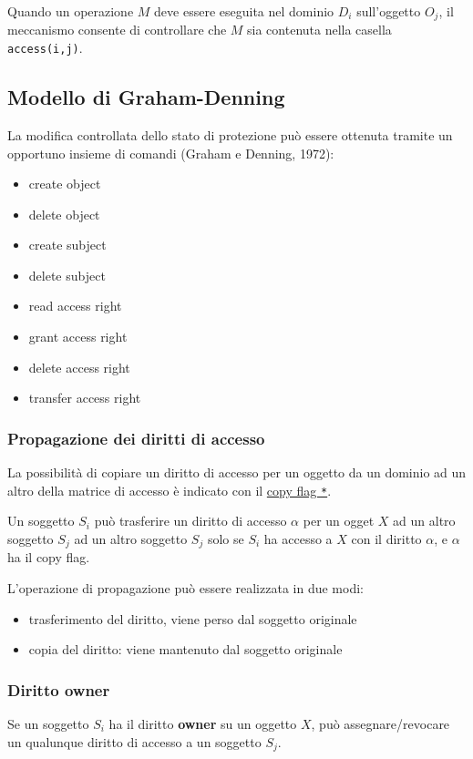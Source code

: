 Quando un operazione $M$ deve essere eseguita nel dominio $D_i$ sull'oggetto $O_j$, il meccanismo consente di controllare che $M$ sia contenuta nella casella \texttt{access(i,j)}.  

\subsection{Modello di Graham-Denning}
La modifica controllata dello stato di protezione può essere ottenuta tramite un opportuno insieme di comandi (Graham e Denning, 1972):
\begin{itemize}
    \item create object
    \item delete object
    \item create subject
    \item delete subject
    \item read access right
    \item grant access right
    \item delete access right
    \item transfer access right
\end{itemize}

\subsubsection{Propagazione dei diritti di accesso}
La possibilità di copiare un diritto di accesso per un oggetto da un dominio ad un altro della matrice di accesso è indicato con il \underline{copy flag \texttt{*}}.

Un soggetto $S_i$ può trasferire un diritto di accesso $\alpha$ per un ogget $X$ ad un altro soggetto $S_j$ ad un altro soggetto $S_j$ solo se $S_i$ ha accesso a $X$ con il diritto $\alpha$, e $\alpha$ ha il copy flag.

L'operazione di propagazione può essere realizzata in due modi:
\begin{itemize}
    \item trasferimento del diritto, viene perso dal soggetto originale
    \item copia del diritto: viene mantenuto dal soggetto originale
\end{itemize}

\subsubsection{Diritto owner}
Se un soggetto $S_i$ ha il diritto \textbf{owner} su un oggetto $X$, può assegnare/revocare un qualunque diritto di accesso a un soggetto $S_j$.

